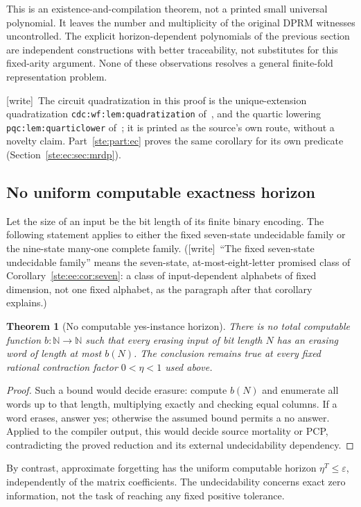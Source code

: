 \documentclass[11pt,letterpaper]{article}
\newtheorem{theorem}{Theorem}[section]
\theoremstyle{definition}
\theoremstyle{remark}
\newcommand{\N}{\mathbb N}
\newcommand{\wtag}{\textup{[write]}}
\begin{document}
This is an existence-and-compilation theorem, not a printed small universal
polynomial. It leaves the number and multiplicity of the original DPRM witnesses
uncontrolled. The explicit horizon-dependent polynomials of the previous section
are independent constructions with better traceability, not substitutes for
this fixed-arity argument. None of these observations resolves a general
finite-fold representation problem.

\wtag\ The circuit quadratization in this proof is the unique-extension quadratization \texttt{cdc:wf:lem:quadratization} of~\cite{cdc}, and the quartic lowering \texttt{pqc:lem:quarticlower} of~\cite{pqc}; it is printed as the source's own route, without a novelty claim. Part~\ref{ste:part:ec} proves the same corollary for its own predicate (Section~\ref{ste:ec:sec:mrdp}).

\subsection{No uniform computable exactness horizon}

Let the size of an input be the bit length of its finite binary encoding. The
following statement applies to either the fixed seven-state undecidable family
or the nine-state many-one complete family.
(\wtag\ ``The fixed seven-state undecidable family'' means the seven-state, at-most-eight-letter promised class of Corollary~\ref{ste:ee:cor:seven}: a class of input-dependent alphabets of fixed dimension, not one fixed alphabet, as the paragraph after that corollary explains.)

\begin{theorem}[No computable yes-instance horizon]\label{ste:ee:thm:nobound}
There is no total computable function $b:\N\to\N$ such that every erasing input
of bit length $N$ has an erasing word of length at most $b(N)$.
The conclusion remains true at every fixed rational contraction factor
$0<\eta<1$ used above.
\end{theorem}
\begin{proof}
Such a bound would decide erasure: compute $b(N)$ and enumerate all words up to
that length, multiplying exactly and checking equal columns. If a word erases,
answer yes; otherwise the assumed bound permits a no answer. Applied to the
compiler output, this would decide source mortality or PCP, contradicting the
proved reduction and its external undecidability dependency.
\end{proof}

By contrast, approximate forgetting has the uniform computable horizon
$\eta^T\leq\varepsilon$, independently of the matrix coefficients. The
undecidability concerns exact zero information, not the task of reaching any
fixed positive tolerance.
\end{document}
